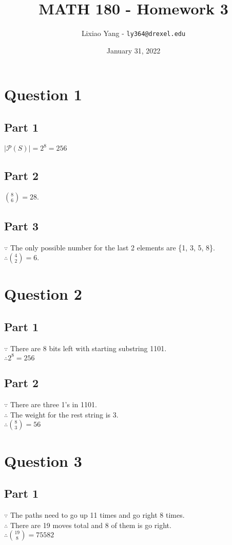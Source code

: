 \documentclass[11pt, oneside]{article}   	%
\title{\bf MATH 180 - Homework 3}
\author{Lixiao Yang - \texttt{ly364@drexel.edu}}
\date{January 31, 2022}							%
\begin{document}
\maketitle

\section*{Question 1}

	\subsection*{Part 1}
	$|\mathcal{P} (S)|=2^{8}=256$

	\subsection*{Part 2}
	$\binom{8}{6} =28$.

	\subsection*{Part 3}
	$\because$ The only possible number for the last 2 elements are \{1, 3, 5, 8\}.\\
	$\therefore\binom{4}{2} =6$.

\section*{Question 2}

	\subsection*{Part 1}
	$\because$ There are 8 bits left with starting substring 1101.\\
	$\therefore 2^{8}=256$

	\subsection*{Part 2}
	$\because$ There are three 1's in 1101.\\
	$\therefore$ The weight for the rest string is 3.\\
	$\therefore \binom{8}{3} =56$


\section*{Question 3}

	\subsection*{Part 1}
	$\because$ The paths need to go up 11 times and go right 8 times.\\
	$\therefore$ There are 19 moves total and 8 of them is go right.\\
	$\therefore \binom{19}{8} =75582$
\end{document}
